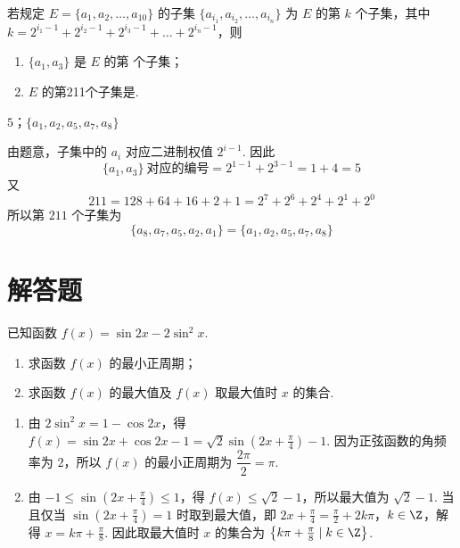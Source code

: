 \begin{problem}
若规定 \(E = \{a_{1}, a_{2}, \dots, a_{10}\}\) 的子集 \(\{a_{i_{1}}, a_{i_{2}}, \dots, a_{i_{n}}\}\) 为 \(E\) 的第 \(k\) 个子集，其中 \(k = 2^{i_{1} - 1} + 2^{i_{2} - 1} + 2^{i_{3} - 1} + \dots + 2^{i_{n} - 1}\)，则
\begin{enumerate}
\item \(\{a_1, a_3\}\) 是 \(E\) 的第\fillinblank{} 个子集；
\item \(E\) 的第211个子集是\fillinblank{}.
\end{enumerate}
\end{problem}

\begin{answer}
\(5\)；\(\{a_{1}, a_{2}, a_{5}, a_{7}, a_{8}\}\)
\end{answer}

\begin{solution}
由题意，子集中的 \(a_i\) 对应二进制权值 \(2^{i-1}\). 因此
\[
\{a_1,a_3\}\ \text{对应的编号}=2^{1-1}+2^{3-1}=1+4=5
\]
又
\[
211=128+64+16+2+1=2^7+2^6+2^4+2^1+2^0
\]
所以第 \(211\) 个子集为
\[
\{a_8,a_7,a_5,a_2,a_1\}=\{a_1,a_2,a_5,a_7,a_8\}
\]
\end{solution}

\section{解答题}

\begin{problem}
已知函数 \( f(x) = \sin 2x - 2\sin^2 x \).
\begin{enumerate}
\item 求函数 \( f(x) \) 的最小正周期；
\item 求函数 \( f(x) \) 的最大值及 \( f(x) \) 取最大值时 \(x\) 的集合.
\end{enumerate}
\end{problem}

\begin{solution}
\begin{enumerate}
\item 由 \(2\sin ^2x=1-\cos 2x\)，得 \(f(x)=\sin 2x+\cos 2x-1=\sqrt{2}\sin\left(2x+\frac{\pi}{4}\right)-1\). 因为正弦函数的角频率为 \(2\)，所以 \(f(x)\) 的最小正周期为 \(\dfrac{2\pi}{2}=\pi\).
\item 由 \(-1\leqslant\sin\left(2x+\frac{\pi}{4}\right)\leqslant1\)，得 \(f(x)\leqslant\sqrt{2}-1\)，所以最大值为 \(\sqrt{2}-1\). 当且仅当 \(\sin\left(2x+\frac{\pi}{4}\right)=1\) 时取到最大值，即 \(2x+\frac{\pi}{4}=\frac{\pi}{2}+2k\pi\)，\(k\in\Z\)，解得 \(x=k\pi+\frac{\pi}{8}\). 因此取最大值时 \(x\) 的集合为 \(\left\{k\pi+\frac{\pi}{8}\mid k\in\Z\right\}\).
\end{enumerate}
\end{solution}

